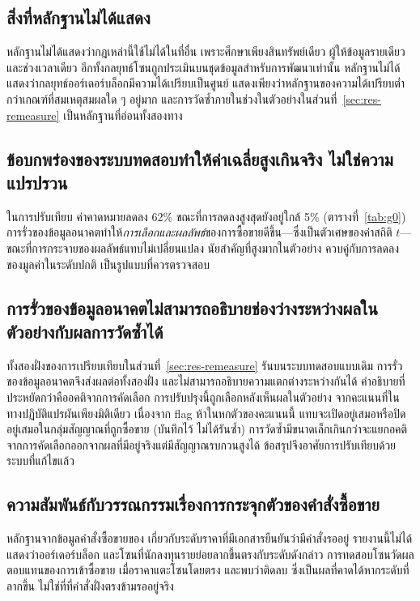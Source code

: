 \documentclass[11pt,a4paper]{article}
\newcommand{\tw}[1]{\texorpdfstring{\hspace{0pt}\mbox{#1}\hspace{0pt}}{#1}}
\begin{document}
\subsection{สิ่งที่\tw{หลักฐาน}ไม่ได้แสดง}
\tw{หลักฐาน}ไม่ได้แสดงว่ากฎเหล่านี้ใช้ไม่ได้ในที่อื่น เพราะศึกษาเพียงสินทรัพย์เดียว ผู้ให้ข้อมูลรายเดียว
และช่วงเวลาเดียว อีกทั้งกลยุทธ์โซนถูกประเมินบนชุดข้อมูลสำหรับการพัฒนาเท่านั้น
\tw{หลักฐาน}ไม่ได้แสดงว่ากลยุทธ์\tw{ออร์เดอร์บล็อก}มีความได้เปรียบเป็นศูนย์
แสดงเพียงว่า\tw{หลักฐาน}ของความได้เปรียบ\tw{ต่ำกว่า}เกณฑ์ที่สมเหตุสมผลใด ๆ อยู่มาก
และการวัดซ้ำภายในช่วงในตัวอย่างใน\tw{ส่วนที่}~\ref{sec:res-remeasure} เป็น\tw{หลักฐาน}ที่อ่อนทั้งสองทาง

\subsection{ข้อบกพร่องของระบบทดสอบทำให้ค่าเฉลี่ยสูงเกินจริง ไม่ใช่ความแปรปรวน}
ในการปรับเทียบ \tw{ค่าคาดหมาย}ลดลง 62\% ขณะที่การลดลงสูงสุดยังอยู่ใกล้ 5\% (\tw{ตารางที่}~\ref{tab:g0})
การรั่วของข้อมูลอนาคตทำให้\emph{การเลือกและผลลัพธ์}ของการ\tw{ซื้อขาย}ดีขึ้น---ซึ่งเป็นตัวเศษของค่าสถิติ $t$---
ขณะที่การ\tw{กระจาย}ของผลลัพธ์แทบไม่เปลี่ยนแปลง นัยสำคัญที่สูงมากในตัวอย่าง
ควบคู่กับการลดลงของมูลค่าในระดับปกติ เป็นรูปแบบที่ควร\tw{ตรวจสอบ}

\subsection{การรั่วของข้อมูลอนาคตไม่สามารถอธิบายช่องว่างระหว่างผลในตัวอย่างกับผลการวัดซ้ำได้}
ทั้งสองฝั่งของการเปรียบเทียบใน\tw{ส่วนที่}~\ref{sec:res-remeasure} รันบนระบบทดสอบแบบเดิม
การรั่วของข้อมูลอนาคตจึงส่งผลต่อทั้งสองฝั่ง และไม่สามารถอธิบายความแตกต่างระหว่างกันได้ %
คำอธิบายที่ประหยัดกว่าคืออคติจากการคัดเลือก การปรับปรุงนี้ถูกเลือกหลังเห็นผลในตัวอย่าง
จากคะแนนที่ในทางปฏิบัติแปรผันเพียงมิติเดียว เนื่องจาก flag ห้าในหกตัวของคะแนนนี้
แทบจะเปิดอยู่เสมอหรือปิดอยู่เสมอในกลุ่มสัญญาณที่ถูก\tw{ซื้อขาย} (บันทึกไว้ ไม่ได้รันซ้ำ) %
การวัดซ้ำมีขนาดเล็กเกินกว่าจะแยกอคติจากการคัดเลือกออกจากผลที่มีอยู่จริงแต่มีสัญญาณรบกวนสูงได้
ข้อสรุปจึงอาศัยการปรับเทียบด้วยระบบที่แก้ไขแล้ว

\subsection{ความสัมพันธ์กับวรรณกรรมเรื่องการกระจุกตัวของ\tw{คำสั่ง}\tw{ซื้อขาย}}
\tw{หลักฐาน}จากข้อมูล\tw{คำสั่ง}\tw{ซื้อขาย}ของ \citet{osler2003currency,osler2005stoploss}
เกี่ยวกับระดับราคาที่มีเอกสารยืนยันว่ามี\tw{คำสั่ง}รออยู่ รายงานนี้ไม่ได้แสดงว่า\tw{ออร์เดอร์บล็อก}
และโซนที่นักลงทุน\tw{รายย่อย}ลากขึ้นตรงกับระดับดังกล่าว การทดสอบโซนวัดผลตอบแทนของการเข้า\tw{ซื้อขาย}
เมื่อราคาแตะโซนโดยตรง และพบว่าติดลบ ซึ่งเป็นผลที่คาดได้หากระดับที่ลากขึ้น
ไม่ใช่ที่ที่\tw{คำสั่ง}ฝั่งตรงข้ามรออยู่จริง
\end{document}
